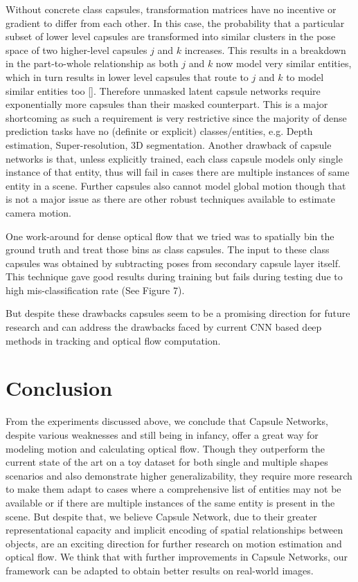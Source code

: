 \documentclass[11pt]{article}
\begin{document}
Without concrete class capsules, transformation matrices
have no incentive or gradient to differ from each other. In
this case, the probability that a particular subset of lower
level capsules are transformed into similar clusters in the
pose space of two higher-level capsules \(j\) and \(k\) increases.
This results in a breakdown in the part-to-whole relationship as both \(j\) and \(k\) now model very similar entities, which
in turn results in lower level capsules that route to \(j\) and \(k\)
to model similar entities too [\cite{13}]. Therefore unmasked latent capsule networks require exponentially more capsules
than their masked counterpart. This is a major shortcoming
as such a requirement is very restrictive since the majority of dense prediction tasks have no (definite or explicit)
classes/entities, e.g. Depth estimation, Super-resolution,
3D segmentation. Another drawback of capsule networks
is that, unless explicitly trained, each class capsule models only single instance of that entity, thus will fail in cases
there are multiple instances of same entity in a scene. Further capsules also cannot model global motion though that is
not a major issue as there are other robust techniques available to estimate camera motion.

One work-around for dense optical flow that we tried was
to spatially bin the ground truth and treat those bins as class
capsules. The input to these class capsules was obtained by
subtracting poses from secondary capsule layer itself. This
technique gave good results during training but fails during
testing due to high mis-classification rate (See Figure 7).

But despite these drawbacks capsules seem to be a
promising direction for future research and can address the
drawbacks faced by current CNN based deep methods in
tracking and optical flow computation.



\section{Conclusion}




From the experiments discussed above, we conclude that
Capsule Networks, despite various weaknesses and still being in infancy, offer a great way for modeling motion and
calculating optical flow. Though they outperform the current state of the art on a toy dataset for both single and multiple shapes scenarios and also demonstrate higher generalizability, they require more research to make them adapt to cases where a comprehensive list of entities may not be
available or if there are multiple instances of the same entity
is present in the scene. But despite that, we believe Capsule
Network, due to their greater representational capacity and
implicit encoding of spatial relationships between objects,
are an exciting direction for further research on motion estimation and optical flow. We think that with further improvements in Capsule Networks, our framework can be adapted
to obtain better results on real-world images.



\end{document}
